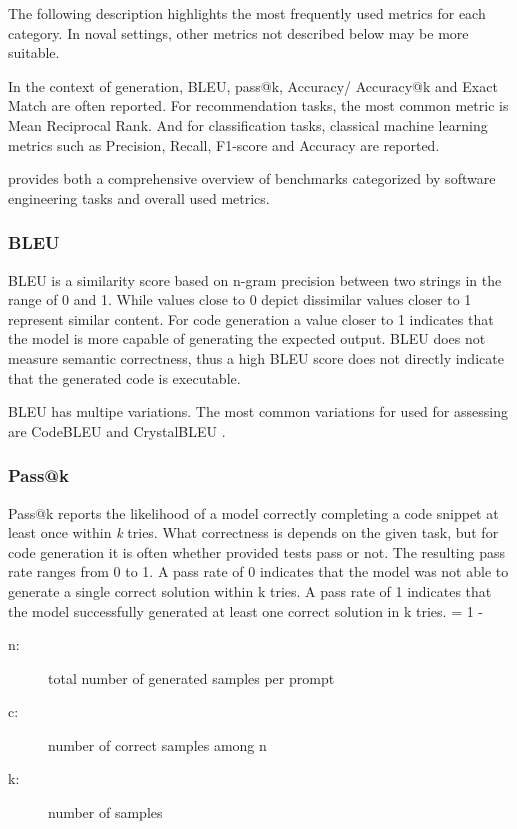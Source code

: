 \documentclass[11pt]{article}
\begin{document}
The following description highlights the most frequently used metrics for each category.
In noval settings, other metrics not described below may be more suitable. %

In the context of generation, BLEU, pass@k, Accuracy/ Accuracy@k and Exact Match are often reported.
For recommendation tasks, the most common metric is Mean Reciprocal Rank.
And for classification tasks, classical machine learning metrics such as Precision, Recall, F1-score and Accuracy are reported.

\cite{10.1145/3695988} provides both a comprehensive overview of benchmarks categorized by software engineering tasks and overall used metrics.

\subsubsection{BLEU}

BLEU is a similarity score based on n-gram precision between two strings in the range of 0 and 1. %
While values close to 0 depict dissimilar values closer to 1 represent similar content.
For code generation a value closer to 1 indicates that the model is more capable of generating the expected output.
BLEU does not measure semantic correctness, thus a high BLEU score does not directly indicate that the generated code is executable.

BLEU has multipe variations.
The most common variations for used for assessing are CodeBLEU \cite{TODO} and CrystalBLEU \cite{TODO}.

\subsubsection{Pass@k}
Pass@k reports the likelihood of a model correctly completing a code snippet at least once within \emph{k} tries.
What correctness is depends on the given task, but for code generation it is often whether provided tests pass or not.
The resulting pass rate ranges from 0 to 1.
A pass rate of 0 indicates that the model was not able to generate a single correct solution within k tries.
A pass rate of 1 indicates that the model successfully generated at least one correct solution in k tries.
 = 1 - 
\begin{description}
    \item[n:] total number of generated samples per prompt
    \item[c:] number of correct samples among  n
    \item[k:] number of samples
\end{description}
\end{document}
